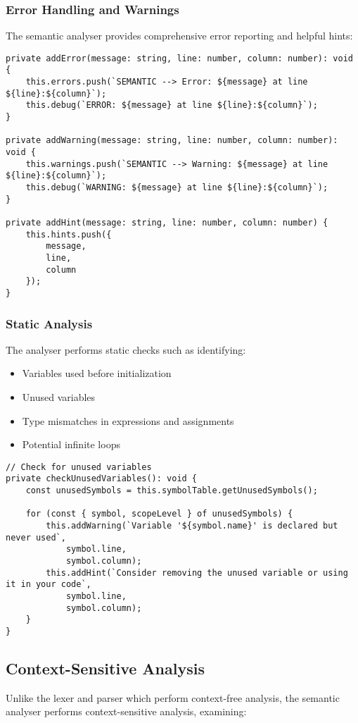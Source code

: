 \documentclass[12pt]{article}
\begin{document}
\subsubsection{Error Handling and Warnings}
The semantic analyser provides comprehensive error reporting and helpful hints:

\begin{lstlisting}
private addError(message: string, line: number, column: number): void {
    this.errors.push(`SEMANTIC --> Error: ${message} at line ${line}:${column}`);
    this.debug(`ERROR: ${message} at line ${line}:${column}`);
}

private addWarning(message: string, line: number, column: number): void {
    this.warnings.push(`SEMANTIC --> Warning: ${message} at line ${line}:${column}`);
    this.debug(`WARNING: ${message} at line ${line}:${column}`);
}

private addHint(message: string, line: number, column: number) {
    this.hints.push({
        message,
        line,
        column
    });
}
\end{lstlisting}

\subsubsection{Static Analysis}
The analyser performs static checks such as identifying:

\begin{itemize}
    \item Variables used before initialization
    \item Unused variables
    \item Type mismatches in expressions and assignments
    \item Potential infinite loops
\end{itemize}

\begin{lstlisting}
// Check for unused variables
private checkUnusedVariables(): void {
    const unusedSymbols = this.symbolTable.getUnusedSymbols();
    
    for (const { symbol, scopeLevel } of unusedSymbols) {
        this.addWarning(`Variable '${symbol.name}' is declared but never used`, 
            symbol.line, 
            symbol.column);
        this.addHint(`Consider removing the unused variable or using it in your code`, 
            symbol.line, 
            symbol.column);
    }
}
\end{lstlisting}

\subsection{Context-Sensitive Analysis}
Unlike the lexer and parser which perform context-free analysis, the semantic analyser performs context-sensitive analysis, examining:
\end{document}
